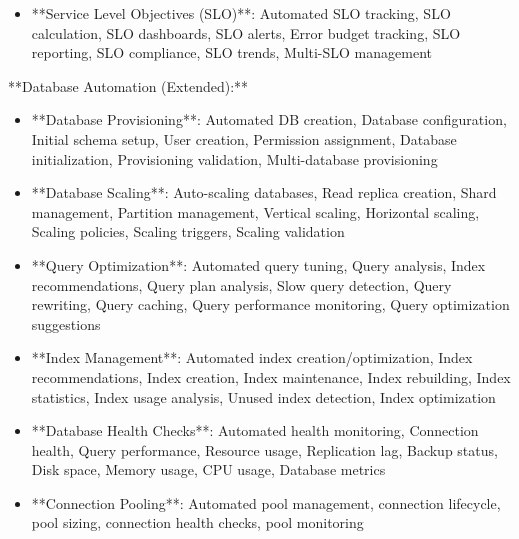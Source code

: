 \documentclass[11pt,a4paper]{article}
\begin{document}
\begin{itemize}
\item **Service Level Objectives (SLO)**: Automated SLO tracking, SLO calculation, SLO dashboards, SLO alerts, Error budget tracking, SLO reporting, SLO compliance, SLO trends, Multi-SLO management
\end{itemize}

**Database Automation (Extended):**

\begin{itemize}
\item **Database Provisioning**: Automated DB creation, Database configuration, Initial schema setup, User creation, Permission assignment, Database initialization, Provisioning validation, Multi-database provisioning
\end{itemize}

\begin{itemize}
\item **Database Scaling**: Auto-scaling databases, Read replica creation, Shard management, Partition management, Vertical scaling, Horizontal scaling, Scaling policies, Scaling triggers, Scaling validation
\end{itemize}

\begin{itemize}
\item **Query Optimization**: Automated query tuning, Query analysis, Index recommendations, Query plan analysis, Slow query detection, Query rewriting, Query caching, Query performance monitoring, Query optimization suggestions
\end{itemize}

\begin{itemize}
\item **Index Management**: Automated index creation/optimization, Index recommendations, Index creation, Index maintenance, Index rebuilding, Index statistics, Index usage analysis, Unused index detection, Index optimization
\end{itemize}

\begin{itemize}
\item **Database Health Checks**: Automated health monitoring, Connection health, Query performance, Resource usage, Replication lag, Backup status, Disk space, Memory usage, CPU usage, Database metrics
\end{itemize}

\begin{itemize}
\item **Connection Pooling**: Automated pool management, connection lifecycle, pool sizing, connection health checks, pool monitoring
\end{itemize}
\end{document}
